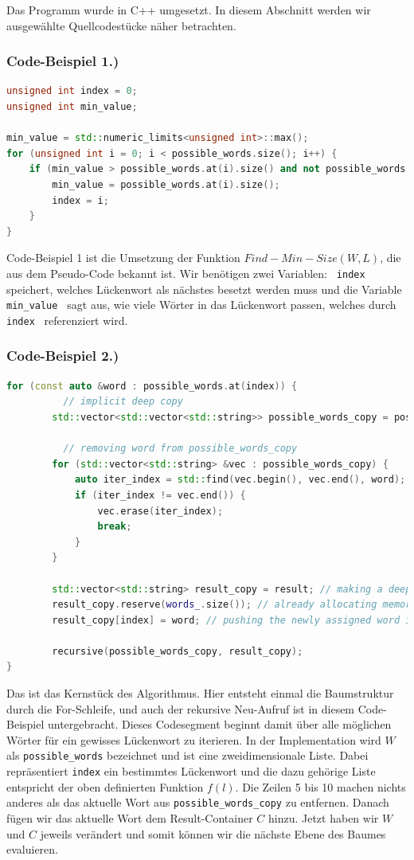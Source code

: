 \documentclass{article}
\begin{document}
Das Programm wurde in C++ umgesetzt. In diesem Abschnitt werden wir ausgewählte Quellcodestücke näher betrachten.
\subsubsection*{Code-Beispiel 1.)}
\lstset{language=C++}
\begin{lstlisting}[language=C++]
unsigned int index = 0;
unsigned int min_value;

min_value = std::numeric_limits<unsigned int>::max();
for (unsigned int i = 0; i < possible_words.size(); i++) {
	if (min_value > possible_words.at(i).size() and not possible_words.at(i).empty()) {
		min_value = possible_words.at(i).size();
		index = i;
	}
}
\end{lstlisting}
Code-Beispiel 1 ist die Umsetzung der Funktion $Find-Min-Size(W, L)$, die aus dem Pseudo-Code bekannt ist. Wir benötigen zwei Variablen: \verb| index | speichert, welches Lückenwort als nächstes besetzt werden muss und die Variable \verb| min_value | sagt aus, wie viele Wörter in das Lückenwort passen, welches durch \verb| index | referenziert wird.

\subsubsection*{Code-Beispiel 2.)}
\lstset{language=C++}
\begin{lstlisting}[language=C++]
for (const auto &word : possible_words.at(index)) {
		  // implicit deep copy 
        std::vector<std::vector<std::string>> possible_words_copy = possible_words;
		
		  // removing word from possible_words_copy
        for (std::vector<std::string> &vec : possible_words_copy) {
            auto iter_index = std::find(vec.begin(), vec.end(), word);
            if (iter_index != vec.end()) {
                vec.erase(iter_index);
                break;
            }
        }

        std::vector<std::string> result_copy = result; // making a deep copy implicitly 
        result_copy.reserve(words_.size()); // already allocating memory 
        result_copy[index] = word; // pushing the newly assigned word into the result container

        recursive(possible_words_copy, result_copy);
}
\end{lstlisting}
Das ist das Kernstück des Algorithmus. Hier entsteht einmal die Baumstruktur durch die For-Schleife, und auch der rekursive Neu-Aufruf ist in diesem Code-Beispiel untergebracht. Dieses Codesegment beginnt damit über alle möglichen Wörter für ein gewisses Lückenwort zu iterieren. In der Implementation wird $ W $ als \verb|possible_words| bezeichnet und ist eine zweidimensionale Liste. Dabei repräsentiert \verb|index| ein bestimmtes Lückenwort und die dazu gehörige Liste entspricht der oben definierten Funktion $ f(l) $. Die Zeilen 5 bis 10 machen nichts anderes als das aktuelle Wort aus \verb|possible_words_copy| zu entfernen. Danach fügen wir das aktuelle Wort dem Result-Container $ C $ hinzu. Jetzt haben wir $ W $ und $ C $ jeweils verändert und somit können wir die nächste Ebene des Baumes evaluieren.
\end{document}
